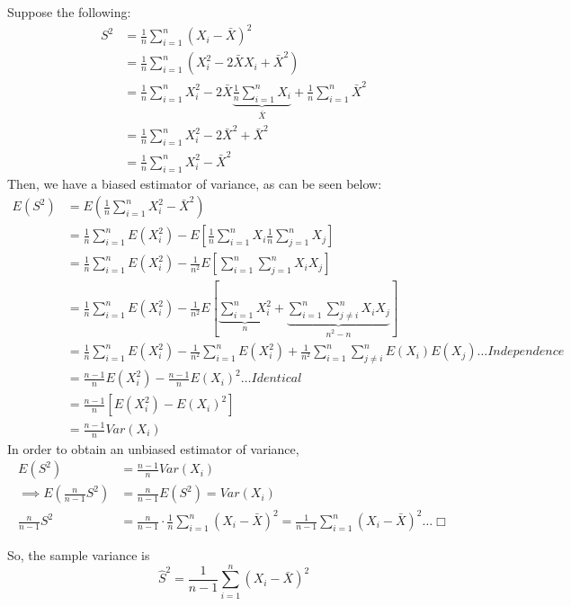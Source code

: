 \documentclass[
]{article}
\begin{document}
Suppose the following: \[\begin{aligned}
S^2 &= \frac{1}{n}\sum_{i=1}^n(X_i-\bar{X})^2 \\
&= \frac{1}{n}\sum_{i=1}^n(X_i^2-2\bar{X}X_i + \bar{X}^2) \\
&= \frac{1}{n}\sum_{i=1}^nX_i^2-2\bar{X} \underbrace{\frac{1}{n}\sum_{i=1}^nX_i}_{\bar{X}} +  \frac{1}{n}\sum_{i=1}^n\bar{X}^2 \\
&= \frac{1}{n}\sum_{i=1}^nX_i^2-2\bar{X}^2 + \bar{X}^2 \\
&= \frac{1}{n}\sum_{i=1}^nX_i^2-\bar{X}^2
\end{aligned}\] Then, we have a biased estimator of variance, as can be
seen below: \[\begin{aligned}
E(S^2) &= E(\frac{1}{n}\sum_{i=1}^nX_i^2-\bar{X}^2) \\
&= \frac{1}{n}\sum_{i=1}^nE(X_i^2) - E\left[\frac{1}{n}\sum_{i=1}^nX_i\frac{1}{n}\sum_{j=1}^nX_j\right] \\
&= \frac{1}{n}\sum_{i=1}^nE(X_i^2) - \frac{1}{n^2}E\left[\sum_{i=1}^n\sum_{j=1}^nX_iX_j\right] \\
&= \frac{1}{n}\sum_{i=1}^nE(X_i^2) -\frac{1}{n^2}E\left[\underbrace{\sum_{i=1}^nX_i^2}_{n} + \underbrace{\sum_{i=1}^n\sum_{j\ne i}^nX_iX_j}_{n^2-n}\right] \\
&= \frac{1}{n}\sum_{i=1}^nE(X_i^2) -\frac{1}{n^2}\sum_{i=1}^nE(X_i^2) + \frac{1}{n^2}\sum_{i=1}^n\sum_{j\ne i}^nE(X_i)E(X_j) \dots Independence \\
&= \frac{n-1}{n}E(X_i^2) - \frac{n-1}{n}E(X_i)^2\dots Identical \\
&= \frac{n-1}{n}[E(X_i^2) -E(X_i)^2] \\
&= \frac{n-1}{n}Var(X_i)
\end{aligned}\] In order to obtain an unbiased estimator of variance,
\[\begin{aligned}
E(S^2) &= \frac{n-1}{n}Var(X_i) \\
\implies E(\frac{n}{n-1}S^2) &= \frac{n}{n-1}E(S^2) = Var(X_i) \\
\frac{n}{n-1}S^2 &= \frac{n}{n-1}\cdot\frac{1}{n}\sum_{i=1}^n(X_i-\bar{X})^2 = \frac{1}{n-1}\sum_{i=1}^n(X_i-\bar{X})^2 \dots \Box
\end{aligned}\]

So, the sample variance is
\[\hat{S}^2 = \frac{1}{n-1}\sum_{i=1}^n(X_i-\bar{X})^2\]
\end{document}
